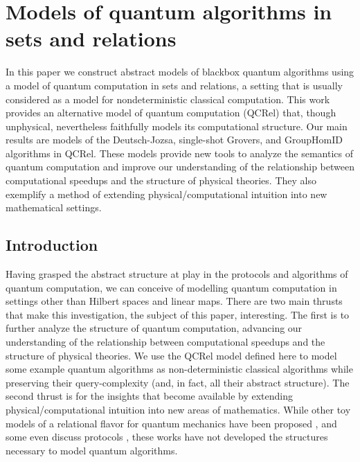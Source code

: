 \chapter{Models of quantum algorithms in sets and relations}

\begin{chapabstract}
        In this paper we construct abstract models of blackbox quantum algorithms using a model of quantum computation in sets and relations, a setting that is usually considered as a model for nondeterministic classical computation.  This work provides an alternative model of quantum computation (QCRel) that, though unphysical, nevertheless faithfully models its computational structure.  Our main results are models of the Deutsch-Jozsa, single-shot Grovers, and GroupHomID algorithms in QCRel. These models provide new tools to analyze the semantics of quantum computation and improve our understanding of the relationship between computational speedups and the structure of physical theories. They also exemplify a method of extending physical/computational intuition into new mathematical settings.
\end{chapabstract}

\section{Introduction}

Having grasped the abstract structure at play in the protocols and algorithms of quantum computation, we can conceive of modelling quantum computation in settings other than Hilbert spaces and linear maps.  There are two main thrusts that make this investigation, the subject of this paper, interesting.  The first is to further analyze the structure of quantum computation, advancing our understanding of the relationship between computational speedups and the structure of physical theories. We use the QCRel model defined here to model some example quantum algorithms as non-deterministic classical algorithms while preserving their query-complexity (and, in fact, all their abstract structure). The second thrust is for the insights that become available by extending physical/computational intuition into new areas of mathematics. While other toy models of a relational flavor for quantum mechanics have been proposed \cite{ellermanModelQM}\cite{discreteQT}\cite{modalQT}\cite{spekk}, and some even discuss protocols \cite{QCFF_James}, these works have not developed the structures necessary to model quantum algorithms.


